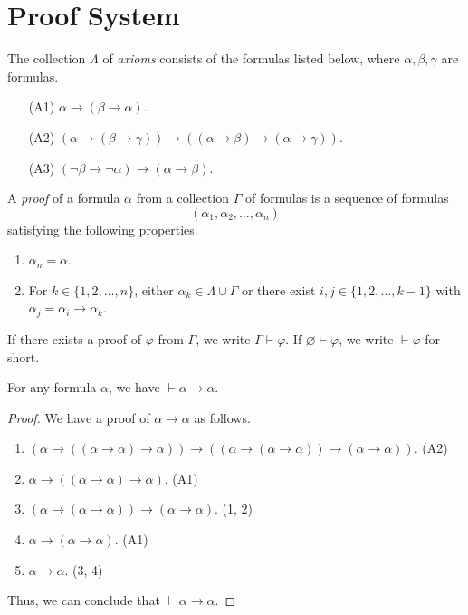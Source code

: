 \section{Proof System}
\begin{definition}
  The collection $\Lambda$ of \emph{axioms} consists of the formulas listed
  below, where $\alpha, \beta, \gamma$ are formulas.
  \begin{enumerate}[leftmargin=3.5em]
    \item[(A1)] $\alpha \to (\beta \to \alpha)$.
    \item[(A2)] $(\alpha \to (\beta \to \gamma)) \to
    ((\alpha \to \beta) \to (\alpha \to \gamma))$.
    \item[(A3)] $(\neg \beta \to \neg \alpha) \to (\alpha \to \beta)$.
  \end{enumerate}
\end{definition}

\begin{definition}
  A \emph{proof} of a formula $\alpha$ from a collection $\Gamma$ of formulas
  is a sequence of formulas
  \begin{equation*}
    (\alpha_1, \alpha_2, \dots, \alpha_n)
  \end{equation*}
  satisfying the following properties.
  \begin{enumerate}
    \item $\alpha_n = \alpha$.
    \item For $k \in \{1, 2, \dots, n\}$, either
    $\alpha_k \in \Lambda \cup \Gamma$ or there exist
    $i, j \in \{1, 2, \dots, k-1\}$ with $\alpha_j = \alpha_i \to \alpha_k$.
  \end{enumerate}
  If there exists a proof of $\varphi$ from $\Gamma$, we write
  $\Gamma \vdash \varphi$.
  If $\varnothing \vdash \varphi$, we write $\vdash \varphi$ for short.
\end{definition}

\begin{theorem}
  \label{thm:identity}
  For any formula $\alpha$, we have $\vdash \alpha \to \alpha$.
\end{theorem}
\begin{proof}
  We have a proof of $\alpha \to \alpha$ as follows.
  \begin{enumerate}[(1)]
    \item $(\alpha \to ((\alpha \to \alpha) \to \alpha)) \to
    ((\alpha \to (\alpha \to \alpha)) \to (\alpha \to \alpha))$.
    \hfill (A2)
    \item $\alpha \to ((\alpha \to \alpha) \to \alpha)$. \hfill (A1)
    \item $(\alpha \to (\alpha \to \alpha)) \to (\alpha \to \alpha)$.
    \hfill (1, 2)
    \item $\alpha \to (\alpha \to \alpha)$. \hfill (A1)
    \item $\alpha \to \alpha$. \hfill (3, 4)
  \end{enumerate}
  Thus, we can conclude that $\vdash \alpha \to \alpha$.
\end{proof}

